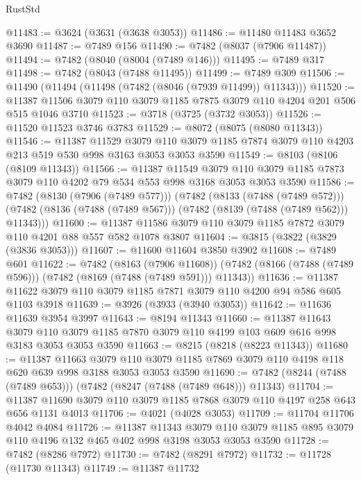 \begin{lexlean}{RustStd}
\begin{coremodule}
@11483 := @3624 (@3631 (@3638 @3053))
@11486 := @11480 @11483 @3652 @3690
@11487 := @7489 @156
@11490 := @7482 (@8037 (@7906 @11487))
@11494 := @7482 (@8040 (@8004 (@7489 @146)))
@11495 := @7489 @317
@11498 := @7482 (@8043 (@7488 @11495))
@11499 := @7489 @309
@11506 := @11490 (@11494 (@11498 (@7482 (@8046 (@7939 @11499)) @11343)))
@11520 := @11387 @11506 @3079 @110 @3079 @1185 @7875 @3079 @110 @4204 @201 @506 @515 @1046 @3710
@11523 := @3718 (@3725 (@3732 @3053))
@11526 := @11520 @11523 @3746 @3783
@11529 := @8072 (@8075 (@8080 @11343))
@11546 := @11387
    @11529
    @3079
    @110
    @3079
    @1185
    @7874
    @3079
    @110
    @4203
    @213
    @519
    @530
    @998
    @3163
    @3053
    @3053
    @3590
@11549 := @8103 (@8106 (@8109 @11343))
@11566 := @11387
    @11549
    @3079
    @110
    @3079
    @1185
    @7873
    @3079
    @110
    @4202
    @79
    @534
    @553
    @998
    @3168
    @3053
    @3053
    @3590
@11586 := @7482
    (@8130 (@7906 (@7489 @577)))
    (@7482
      (@8133 (@7488 (@7489 @572)))
      (@7482 (@8136 (@7488 (@7489 @567))) (@7482 (@8139 (@7488 (@7489 @562))) @11343)))
@11600 := @11387 @11586 @3079 @110 @3079 @1185 @7872 @3079 @110 @4201 @88 @557 @582 @1078 @3807
@11604 := @3815 (@3822 (@3829 (@3836 @3053)))
@11607 := @11600 @11604 @3850 @3902
@11608 := @7489 @601
@11622 := @7482
    (@8163 (@7906 @11608))
    (@7482 (@8166 (@7488 (@7489 @596))) (@7482 (@8169 (@7488 (@7489 @591))) @11343))
@11636 := @11387 @11622 @3079 @110 @3079 @1185 @7871 @3079 @110 @4200 @94 @586 @605 @1103 @3918
@11639 := @3926 (@3933 (@3940 @3053))
@11642 := @11636 @11639 @3954 @3997
@11643 := @8194 @11343
@11660 := @11387
    @11643
    @3079
    @110
    @3079
    @1185
    @7870
    @3079
    @110
    @4199
    @103
    @609
    @616
    @998
    @3183
    @3053
    @3053
    @3590
@11663 := @8215 (@8218 (@8223 @11343))
@11680 := @11387
    @11663
    @3079
    @110
    @3079
    @1185
    @7869
    @3079
    @110
    @4198
    @118
    @620
    @639
    @998
    @3188
    @3053
    @3053
    @3590
@11690 := @7482 (@8244 (@7488 (@7489 @653))) (@7482 (@8247 (@7488 (@7489 @648))) @11343)
@11704 := @11387 @11690 @3079 @110 @3079 @1185 @7868 @3079 @110 @4197 @258 @643 @656 @1131 @4013
@11706 := @4021 (@4028 @3053)
@11709 := @11704 @11706 @4042 @4084
@11726 := @11387
    @11343
    @3079
    @110
    @3079
    @1185
    @895
    @3079
    @110
    @4196
    @132
    @465
    @402
    @998
    @3198
    @3053
    @3053
    @3590
@11728 := @7482 (@8286 @7972)
@11730 := @7482 (@8291 @7972)
@11732 := @11728 (@11730 @11343)
@11749 := @11387
    @11732

\end{coremodule}
\end{lexlean}
